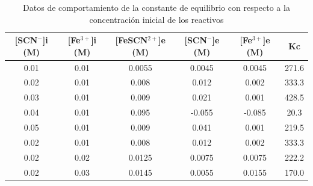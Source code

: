 \documentclass[10pt]{article}
\begin{document}
\begin{multicols*}{2}
    \begin{table}[H]
        \centering
        \caption{Datos de comportamiento de la constante de equilibrio con respecto a la concentración inicial de los reactivos}
        \begin{adjustbox}{width=0.48\textwidth}
            \begin{tabular}{|c|c|c|c|c|c|}
                \hline
                \textbf{[SCN$^-$]i (M)} & \textbf{[Fe$^{3+}$]i (M)} & \textbf{[FeSCN$^{2+}$]e (M)} & \textbf{[SCN$^-$]e (M)} & \textbf{[Fe$^{3+}$]e (M)} & \textbf{Kc} \\
                \hline
                0.01                    & 0.01                      & 0.0055                       & 0.0045                  & 0.0045                    & 271.6       \\
                0.02                    & 0.01                      & 0.008                        & 0.012                   & 0.002                     & 333.3       \\
                0.03                    & 0.01                      & 0.009                        & 0.021                   & 0.001                     & 428.5       \\
                0.04                    & 0.01                      & 0.095                        & -0.055                  & -0.085                    & 20.3        \\
                0.05                    & 0.01                      & 0.009                        & 0.041                   & 0.001                     & 219.5       \\
                0.02                    & 0.01                      & 0.008                        & 0.012                   & 0.002                     & 333.3       \\
                0.02                    & 0.02                      & 0.0125                       & 0.0075                  & 0.0075                    & 222.2       \\
                0.02                    & 0.03                      & 0.0145                       & 0.0055                  & 0.0155                    & 170.0       \\
                \hline
            \end{tabular}
        \end{adjustbox}
    \end{table}


\end{multicols*}
\end{document}
